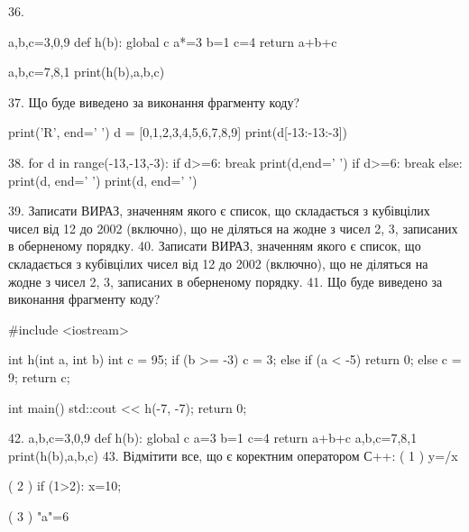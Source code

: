 \documentclass[11pt]{article}
\begin{document}
36. 

a,b,c=3,0,9
def h(b):
global c    a*=3
    b=1
    c=4
    return a+b+c

a,b,c=7,8,1
print(h(b),a,b,c)

37. Що буде виведено за виконання фрагменту коду?

print('R', end=' ')
d = [0,1,2,3,4,5,6,7,8,9]
print(d[-13:-13:-3])


38. 
for d in range(-13,-13,-3):
    if d>=6:
        break
        print(d,end=' ')
    if d>=6:
        break
else:
    print(d, end=' ')
print(d, end=' ')

39. 
Записати ВИРАЗ, значенням якого є список, що складається з кубівцілих чисел від 12 до 2002 (включно), що не діляться на жодне з чисел 2, 3, записаних в оберненому порядку.
40. 
Записати ВИРАЗ, значенням якого є список, що складається з кубівцілих чисел від 12 до 2002 (включно), що не діляться на жодне з чисел 2, 3, записаних в оберненому порядку.
41. Що буде виведено за виконання фрагменту коду?

#include <iostream>

int h(int a, int b){
    int c = 95;
    if (b >= -3)
        c = 3;
    else if (a < -5)
         return 0;
    else 
        c = 9;
    return c;
}

int main(){
    std::cout << h(-7, -7);
    return 0;
}

42. 
a,b,c=3,0,9
    def h(b):
      global c      a=3
      b=1
      c=4
      return a+b+c
    a,b,c=7,8,1
    print(h(b),a,b,c)
43. %
Відмітити все, що є коректним оператором С++:
( 1 ) y=/x

( 2 ) if (1>2): x=10;

( 3 ) "a"=6
\end{document}
